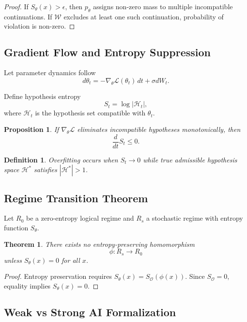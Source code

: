 \documentclass[12pt]{article}
\newtheorem{proposition}{Proposition}
\newtheorem{theorem}{Theorem}
\newtheorem{definition}{Definition}
\begin{document}
\begin{proof}
If $S_\theta(x) > \epsilon$, then $p_\theta$ assigns non-zero mass to multiple incompatible continuations. If $\mathcal{W}$ excludes at least one such continuation, probability of violation is non-zero.
\end{proof}

\subsection{Gradient Flow and Entropy Suppression}

Let parameter dynamics follow
\[
d\theta_t = -\nabla_\theta \mathcal{L}(\theta_t)\, dt + \sigma dW_t.
\]

Define hypothesis entropy
\[
S_t = \log |\mathcal{H}_t|,
\]
where $\mathcal{H}_t$ is the hypothesis set compatible with $\theta_t$.

\begin{proposition}
If $\nabla_\theta \mathcal{L}$ eliminates incompatible hypotheses monotonically, then
\[
\frac{d}{dt} S_t \leq 0.
\]
\end{proposition}

\begin{definition}
Overfitting occurs when $S_t \to 0$ while true admissible hypothesis space $\mathcal{H}^\ast$ satisfies $|\mathcal{H}^\ast| > 1$.
\end{definition}

\subsection{Regime Transition Theorem}

Let $R_0$ be a zero-entropy logical regime and $R_s$ a stochastic regime with entropy function $S_\theta$.

\begin{theorem}
There exists no entropy-preserving homomorphism
\[
\phi : R_s \to R_0
\]
unless $S_\theta(x)=0$ for all $x$.
\end{theorem}

\begin{proof}
Entropy preservation requires $S_\theta(x)=S_{\mathcal{O}}(\phi(x))$. Since $S_{\mathcal{O}}=0$, equality implies $S_\theta(x)=0$.
\end{proof}

\subsection{Weak vs Strong AI Formalization}
\end{document}
